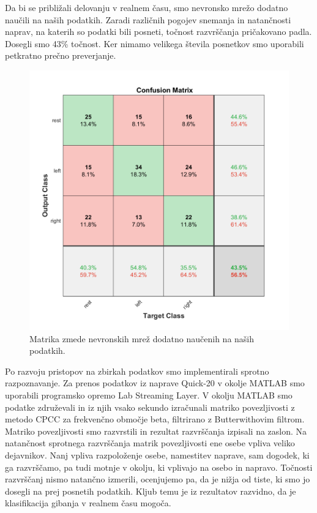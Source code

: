 Da bi se približali delovanju v realnem času, smo nevronsko mrežo dodatno naučili na naših podatkih. Zaradi različnih pogojev snemanja in natančnosti naprav, na katerih so podatki bili posneti, točnost razvrščanja pričakovano padla. Dosegli smo 43\% točnost. Ker nimamo velikega števila posnetkov smo uporabili petkratno prečno preverjanje. 
\begin{figure}
\begin{center}
\includegraphics[width=0.8\linewidth]{slike/Confusion_13-20Hz_0s-4s_retrained.png}
\end{center}
\caption[Matrika zmede dodatno naučene nevronske mreže.]{Matrika zmede nevronskih mrež dodatno naučenih na naših podatkih.}
\end{figure}


Po razvoju pristopov na zbirkah podatkov smo implementirali sprotno razpoznavanje. Za prenos podatkov iz naprave Quick-20 v okolje MATLAB smo uporabili programsko opremo Lab Streaming Layer. V okolju MATLAB smo podatke združevali in iz njih vsako sekundo izračunali matriko povezljivosti z metodo CPCC za frekvenčno območje beta, filtrirano z Butterwithovim filtrom. Matriko povezljivosti smo razvrstili in rezultat razvrščanja izpisali na zaslon. Na natančnost sprotnega razvrščanja matrik povezljivosti ene osebe vpliva veliko dejavnikov. Nanj vpliva razpoloženje osebe, namestitev naprave, sam dogodek, ki ga razvrščamo, pa tudi motnje v okolju, ki vplivajo na osebo in napravo. Točnosti razvrščanj nismo natančno izmerili, ocenjujemo pa, da je nižja od tiste, ki smo jo dosegli na prej posnetih podatkih. Kljub temu je iz rezultatov razvidno, da je klasifikacija gibanja v realnem času mogoča.


